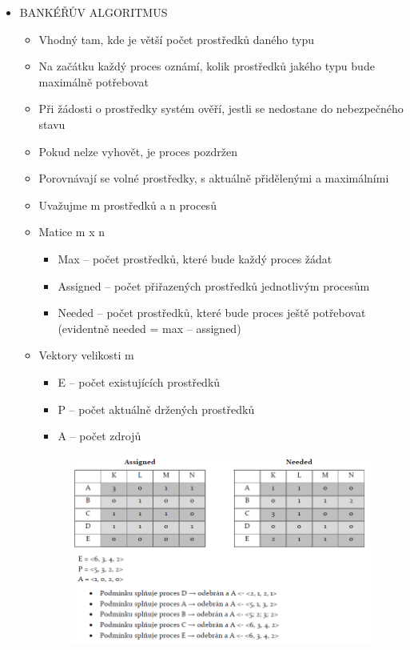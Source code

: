 \documentclass[10pt,a4paper]{article}
\begin{document}
\begin{itemize}
\begin{itemize}
\begin{itemize}
		\end{itemize}
		\item BANKÉŘŮV ALGORITMUS
		\begin{itemize}
			\item Vhodný tam, kde je větší počet prostředků daného typu
			\item Na začátku každý proces oznámí, kolik prostředků jakého typu bude maximálně potřebovat
			\item Při žádosti o prostředky systém ověří, jestli se nedostane do nebezpečného stavu
			\item Pokud nelze vyhovět, je proces pozdržen
			\item Porovnávají se volné prostředky, s aktuálně přidělenými a maximálními
			\item Uvažujme m prostředků a n procesů
			\item Matice m x n
			\begin{itemize}
				\item Max – počet prostředků, které bude každý proces žádat
				\item Assigned – počet přiřazených prostředků jednotlivým procesům
				\item Needed – počet prostředků, které bude proces ještě potřebovat (evidentně needed = max – assigned)
			\end{itemize}
			\item Vektory velikosti m
			\begin{itemize}
				\item E – počet existujících prostředků
				\item P – počet aktuálně držených prostředků
				\item A – počet zdrojů
			\end{itemize}
			\begin{figure} [h]
				\includegraphics[scale=0.8]{img/bankeruv_algoritmus.png}

\end{figure}
\end{itemize}
\end{itemize}
\end{itemize}
\end{document}
